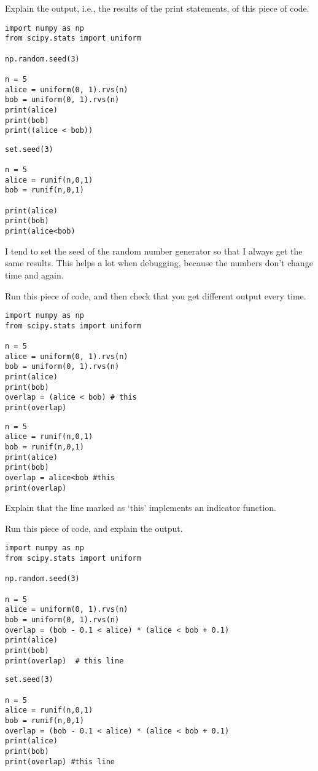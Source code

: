 \begin{exercise}
Explain the output, i.e., the results of the print statements, of this piece of code.
\begin{verbatim}
import numpy as np
from scipy.stats import uniform

np.random.seed(3)

n = 5
alice = uniform(0, 1).rvs(n)
bob = uniform(0, 1).rvs(n)
print(alice)
print(bob)
print((alice < bob))
\end{verbatim}

\begin{verbatim}
set.seed(3)

n = 5
alice = runif(n,0,1)
bob = runif(n,0,1)

print(alice)
print(bob)
print(alice<bob)
\end{verbatim}

I tend to set the seed of the random number generator so that I always get the same results. This helps a lot when debugging, because the numbers don't change time and again.
\end{exercise}

\begin{exercise}
Run  this piece of code, and then check that you get different output every time.
\begin{verbatim}
import numpy as np
from scipy.stats import uniform

n = 5
alice = uniform(0, 1).rvs(n)
bob = uniform(0, 1).rvs(n)
print(alice)
print(bob)
overlap = (alice < bob) # this
print(overlap)
\end{verbatim}

\begin{verbatim}
n = 5
alice = runif(n,0,1)
bob = runif(n,0,1)
print(alice)
print(bob)
overlap = alice<bob #this
print(overlap)
\end{verbatim}

Explain that the line marked as `this' implements an indicator function.
\end{exercise}


\begin{exercise}
Run  this piece of code, and explain the output.
\begin{verbatim}
import numpy as np
from scipy.stats import uniform

np.random.seed(3)

n = 5
alice = uniform(0, 1).rvs(n)
bob = uniform(0, 1).rvs(n)
overlap = (bob - 0.1 < alice) * (alice < bob + 0.1)
print(alice)
print(bob)
print(overlap)  # this line
\end{verbatim}

\begin{verbatim}
set.seed(3)

n = 5
alice = runif(n,0,1)
bob = runif(n,0,1)
overlap = (bob - 0.1 < alice) * (alice < bob + 0.1)
print(alice)
print(bob)
print(overlap) #this line
\end{verbatim}

\end{exercise}

